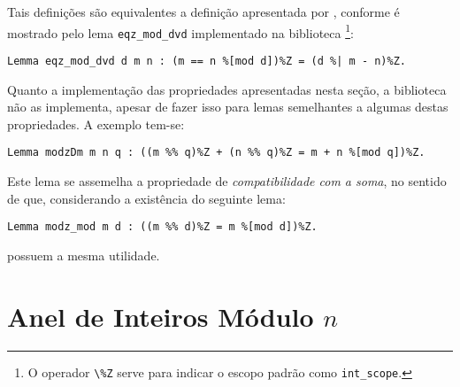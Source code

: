 Tais definições são equivalentes a definição apresentada por \cite{book:2399854}, conforme é mostrado pelo lema \lstinline[language = coq]{eqz_mod_dvd} implementado na biblioteca \footnote{O operador 
\lstinline[language = coq]{\%Z} serve para indicar o escopo padrão como \lstinline[language=coq]|int_scope|.}:
    \begin{lstlisting}[language=coq,frame=single,tabsize=1]
Lemma eqz_mod_dvd d m n : (m == n %[mod d])%Z = (d %| m - n)%Z.
    \end{lstlisting}

Quanto a implementação das propriedades apresentadas nesta seção, a biblioteca não as implementa, apesar de fazer isso para lemas semelhantes a algumas destas propriedades. A exemplo tem-se:
    \begin{lstlisting}[language=coq,frame=single,tabsize=1]
Lemma modzDm m n q : ((m %% q)%Z + (n %% q)%Z = m + n %[mod q])%Z.
    \end{lstlisting}
Este lema se assemelha a propriedade de \textit{compatibilidade com a soma}, no sentido de que, considerando a existência do seguinte lema:
    \begin{lstlisting}[language=coq,frame=single,tabsize=1]
Lemma modz_mod m d : ((m %% d)%Z = m %[mod d])%Z.
    \end{lstlisting}
possuem a mesma utilidade. 


\section{Anel de Inteiros Módulo $n$}

